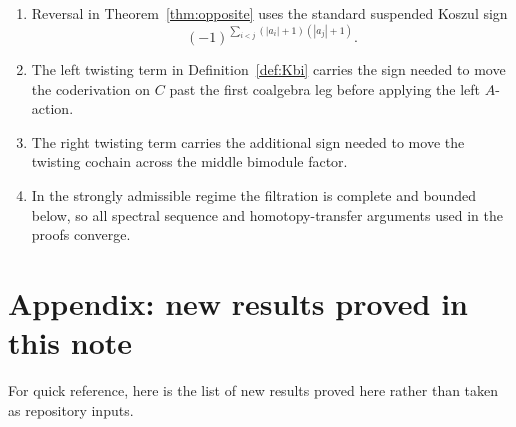 \begin{enumerate}[label=(\arabic*)]
\item Reversal in Theorem~\ref{thm:opposite} uses the standard suspended Koszul sign
\[
(-1)^{\sum_{i<j}(|a_i|+1)(|a_j|+1)}.
\]

\item The left twisting term in Definition~\ref{def:Kbi} carries the sign needed to move the
coderivation on $C$ past the first coalgebra leg before applying the left $A$-action.

\item The right twisting term carries the additional sign needed to move the twisting cochain across
the middle bimodule factor.

\item In the strongly admissible regime the filtration is complete and bounded below, so all spectral
sequence and homotopy-transfer arguments used in the proofs converge.
\end{enumerate}

\section{Appendix: new results proved in this note}

For quick reference, here is the list of new results proved here rather than taken as repository
inputs.

